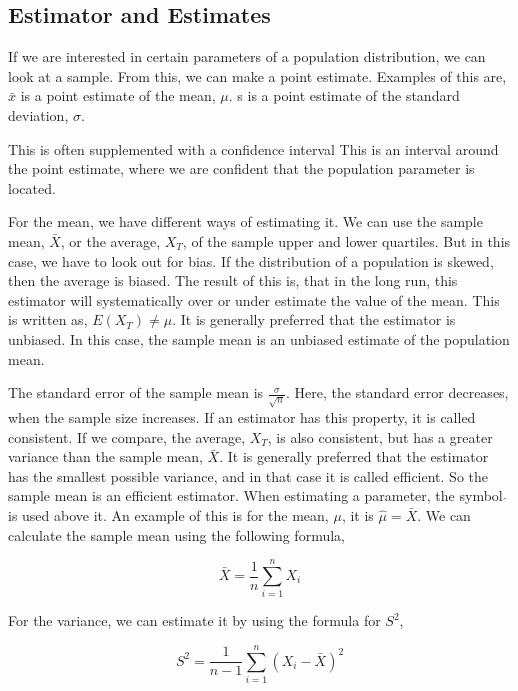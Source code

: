 \subsection{Estimator and Estimates}
If we are interested in certain parameters of a population distribution, we can look at a sample. From this, we can make a point estimate. 
\newline
Examples of this are, 
\newline
$\bar{x}$ is a point estimate of the mean, $\mu$.
\newline
s is a point estimate of the standard deviation, $\sigma$.
\newline

\noindent This is often supplemented with a confidence interval
\newline
This is an interval around the point estimate, where we are confident that the population parameter is located.
\newline

\noindent For the mean, we have different ways of estimating it. We can use the sample mean, $\bar{X}$, or the average, $X_T$, of the sample upper and lower quartiles. 
But in this case, we have to look out for bias. If the distribution of a population is skewed, then the average is biased. The result of this is, that in the long run, this estimator will systematically over or under estimate the value of the mean. This is written as,
\newline
$E(X_T) \neq \mu$.
\newline
It is generally preferred that the estimator is unbiased. In this case, the sample mean is an unbiased estimate of the population mean.
\newline

\noindent The standard error of the sample mean is $\frac{\sigma}{\sqrt{n}}$. Here, the standard error decreases, when the sample size increases. If an estimator has this property, it is called consistent. If we compare, the average, $X_T$, is also consistent, but has a greater variance than the sample mean, $\bar{X}$. 
\newline
It is generally preferred that the estimator has the smallest possible variance, and in that case it is called efficient. So the sample mean is an efficient estimator.
\newline
When estimating a parameter, the symbol $\hat{}$ is used above it. An example of this is for the mean, $\mu$, it is $\hat{\mu} = \bar{X}$.
\newline
We can calculate the sample mean using the following formula,

\begin{equation}
	\bar{X}=\frac{1}{n} \sum_{i=1}^{n}X_i
\end{equation}


\noindent For the variance, we can estimate it by using the formula for $S^2$,

\begin{equation}
	S^2=\frac{1}{n-1} \sum_{i=1}^{n}(X_i-\bar{X})^2
\end{equation}
